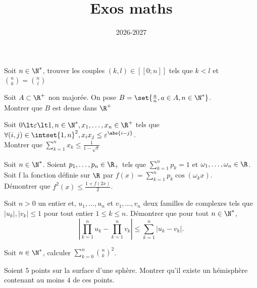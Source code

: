 \documentclass[11pt,a4paper]{article}
\begin{document}
\title{Exos maths}
\author{}
\date{2026-2027}

\maketitle


\begin{exercise}
Soit $n\in\N^*$, trouver les couples $(k,l)\in[\![0;n]\!]$ tels que $k\lt l$ et $\binom{n}{k}=\binom{n}{l}$
\end{exercise}

\begin{exercise}
Soit $A\subset\R^+$ non majorée. On pose $B=\set{\frac{a}{n},a\in A, n\in\N^*}$.\\
Montrer que $B$ est dense dans $\R^+$
\end{exercise}

\begin{exercise}
Soit $0\lt\varepsilon\lt1, n\in\N^*, x_1,\ldots,x_n\in\R^+$ tels que $\forall (i,j)\in\intset{1,n}^2, x_ix_j\leq\varepsilon^{\abs{i-j}}$.\\
Montrer que $\displaystyle\sum_{k=1}^nx_k\leq \frac{1}{1-\sqrt{\varepsilon}}$
\end{exercise}

\begin{exercise}
Soit $n\in\N^*$.
Soient $p_1,\ldots,p_n\in\R_+$ tels que
$\displaystyle\sum_{k=1}^np_k=1$
et $\omega_1,\ldots,\omega_n\in\R$. \\
Soit f la fonction définie sur $\R$ par
$f(x)=\displaystyle\sum_{k=1}^np_k\cos{(\omega_kx)}$.\\
Démontrer que
$f^2(x)\le\frac{1+f(2x)}{2}$.
\end{exercise}

\begin{exercise}
Soit $n>0$ un entier et, $u_1,\ldots,u_n$ et $v_1,\ldots,v_n$ deux familles de complexes tels que $|u_k|,|v_k|\le1$ pour tout entier $1\le k\le n$. Démontrer que pour tout $n\in\N^*$,
\[\left|\prod_{k=1}^nu_k-\prod_{k=1}^nv_k\right|\le\sum_{k=1}^n|u_k-v_k|.\]
\end{exercise}

\begin{exercise}
Soit $n\in\N^*$, calculer $\displaystyle\sum_{k=0}^n\binom{n}{k}^2$.
\end{exercise}

\begin{exercise}
Soient $5$ points sur la surface d'une sphère. Montrer qu'il existe un hémisphère contenant au moins $4$ de ces points.
\end{exercise}
\end{document}
